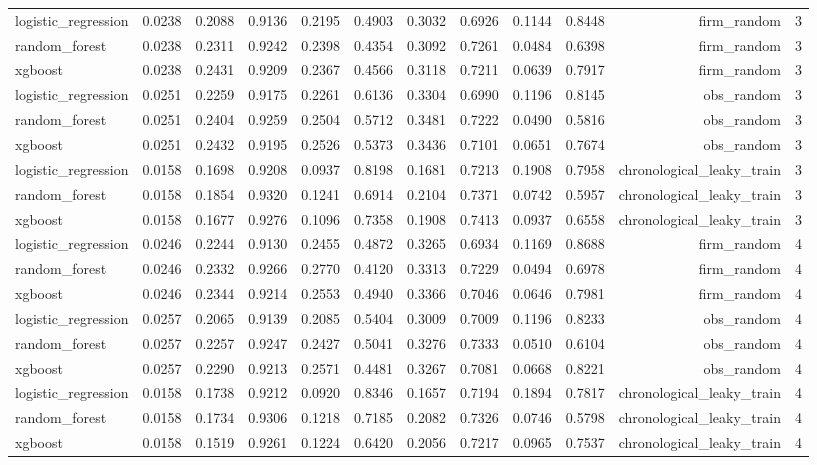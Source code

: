 \begin{table}[htbp]
\begin{tabular}{lrrrrrrrrrrr}
logistic\_regression & 0.0238 & 0.2088 & 0.9136 & 0.2195 & 0.4903 & 0.3032 & 0.6926 & 0.1144 & 0.8448 & firm\_random & 3 \\
random\_forest & 0.0238 & 0.2311 & 0.9242 & 0.2398 & 0.4354 & 0.3092 & 0.7261 & 0.0484 & 0.6398 & firm\_random & 3 \\
xgboost & 0.0238 & 0.2431 & 0.9209 & 0.2367 & 0.4566 & 0.3118 & 0.7211 & 0.0639 & 0.7917 & firm\_random & 3 \\
logistic\_regression & 0.0251 & 0.2259 & 0.9175 & 0.2261 & 0.6136 & 0.3304 & 0.6990 & 0.1196 & 0.8145 & obs\_random & 3 \\
random\_forest & 0.0251 & 0.2404 & 0.9259 & 0.2504 & 0.5712 & 0.3481 & 0.7222 & 0.0490 & 0.5816 & obs\_random & 3 \\
xgboost & 0.0251 & 0.2432 & 0.9195 & 0.2526 & 0.5373 & 0.3436 & 0.7101 & 0.0651 & 0.7674 & obs\_random & 3 \\
logistic\_regression & 0.0158 & 0.1698 & 0.9208 & 0.0937 & 0.8198 & 0.1681 & 0.7213 & 0.1908 & 0.7958 & chronological\_leaky\_train & 3 \\
random\_forest & 0.0158 & 0.1854 & 0.9320 & 0.1241 & 0.6914 & 0.2104 & 0.7371 & 0.0742 & 0.5957 & chronological\_leaky\_train & 3 \\
xgboost & 0.0158 & 0.1677 & 0.9276 & 0.1096 & 0.7358 & 0.1908 & 0.7413 & 0.0937 & 0.6558 & chronological\_leaky\_train & 3 \\
logistic\_regression & 0.0246 & 0.2244 & 0.9130 & 0.2455 & 0.4872 & 0.3265 & 0.6934 & 0.1169 & 0.8688 & firm\_random & 4 \\
random\_forest & 0.0246 & 0.2332 & 0.9266 & 0.2770 & 0.4120 & 0.3313 & 0.7229 & 0.0494 & 0.6978 & firm\_random & 4 \\
xgboost & 0.0246 & 0.2344 & 0.9214 & 0.2553 & 0.4940 & 0.3366 & 0.7046 & 0.0646 & 0.7981 & firm\_random & 4 \\
logistic\_regression & 0.0257 & 0.2065 & 0.9139 & 0.2085 & 0.5404 & 0.3009 & 0.7009 & 0.1196 & 0.8233 & obs\_random & 4 \\
random\_forest & 0.0257 & 0.2257 & 0.9247 & 0.2427 & 0.5041 & 0.3276 & 0.7333 & 0.0510 & 0.6104 & obs\_random & 4 \\
xgboost & 0.0257 & 0.2290 & 0.9213 & 0.2571 & 0.4481 & 0.3267 & 0.7081 & 0.0668 & 0.8221 & obs\_random & 4 \\
logistic\_regression & 0.0158 & 0.1738 & 0.9212 & 0.0920 & 0.8346 & 0.1657 & 0.7194 & 0.1894 & 0.7817 & chronological\_leaky\_train & 4 \\
random\_forest & 0.0158 & 0.1734 & 0.9306 & 0.1218 & 0.7185 & 0.2082 & 0.7326 & 0.0746 & 0.5798 & chronological\_leaky\_train & 4 \\
xgboost & 0.0158 & 0.1519 & 0.9261 & 0.1224 & 0.6420 & 0.2056 & 0.7217 & 0.0965 & 0.7537 & chronological\_leaky\_train & 4 \\
\bottomrule
\end{tabular}
\end{table}
